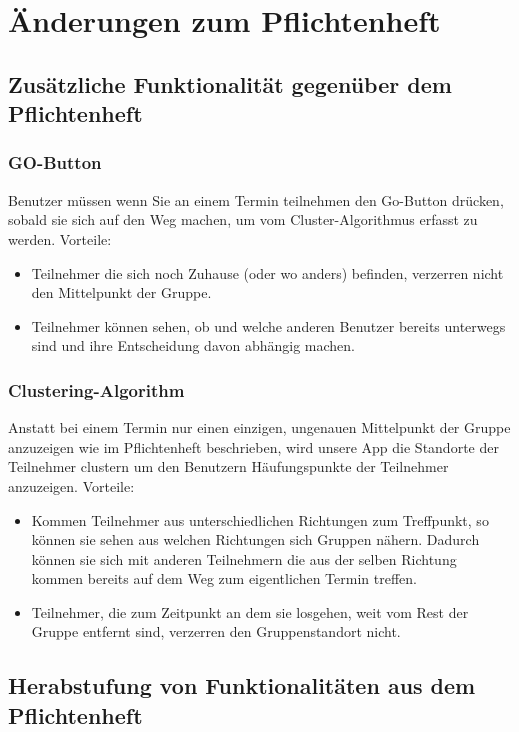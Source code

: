 \section{Änderungen zum Pflichtenheft}
	\subsection{Zusätzliche Funktionalität gegenüber dem Pflichtenheft}
	\subsubsection{GO-Button}
		Benutzer müssen wenn Sie an einem Termin teilnehmen den Go-Button drücken, sobald sie sich auf den Weg machen, um vom Cluster-Algorithmus erfasst zu werden. 
		\newline
		Vorteile:
		\begin{itemize}
		\item Teilnehmer die sich noch Zuhause (oder wo anders) befinden, verzerren nicht den Mittelpunkt der Gruppe.
		\item Teilnehmer können sehen, ob und welche anderen Benutzer bereits unterwegs sind und ihre Entscheidung davon abhängig machen.
		\end{itemize}
	\subsubsection{Clustering-Algorithm}
	Anstatt bei einem Termin nur einen einzigen, ungenauen Mittelpunkt der Gruppe anzuzeigen wie im Pflichtenheft beschrieben, wird unsere App die Standorte der Teilnehmer clustern um den Benutzern Häufungspunkte der Teilnehmer anzuzeigen.
		\newline
		Vorteile:
		\begin{itemize}
		\item Kommen Teilnehmer aus unterschiedlichen Richtungen zum Treffpunkt, so können sie sehen aus welchen Richtungen sich Gruppen nähern. Dadurch können sie sich mit anderen Teilnehmern die aus der selben Richtung kommen bereits auf dem Weg zum eigentlichen Termin treffen.
		\item Teilnehmer, die zum Zeitpunkt an dem sie losgehen, weit vom Rest der Gruppe entfernt sind, verzerren den Gruppenstandort nicht.
		\end{itemize}
\newpage
	\subsection{Herabstufung von Funktionalitäten aus dem Pflichtenheft}

